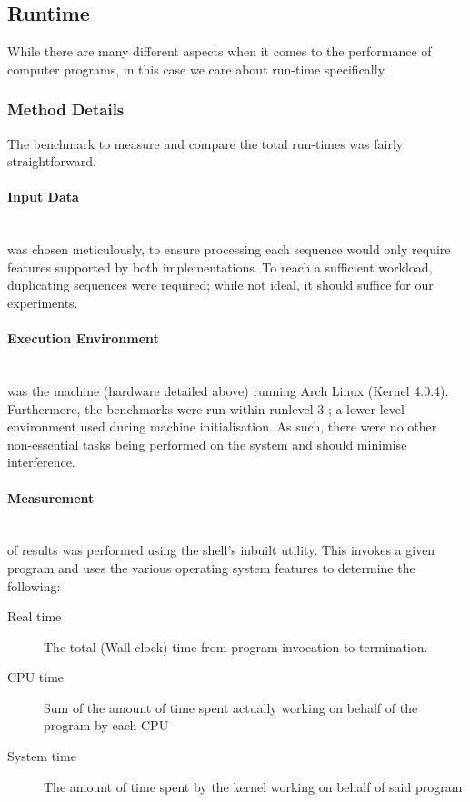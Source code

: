 \subsection{Runtime}
While there are many different aspects when it comes to the performance of computer programs, in this case we care about run-time specifically. 

\subsubsection{Method Details}

The benchmark to measure and compare the total run-times was fairly straightforward.

\paragraph{Input Data} \hfill \\
was chosen meticulously, to ensure processing each sequence would only require features supported by both implementations. To reach a sufficient workload, duplicating sequences were required; while not ideal, it should suffice for our experiments.

\paragraph{Execution Environment} \hfill \\
was the machine (hardware detailed above) running Arch Linux (Kernel 4.0.4). Furthermore, the benchmarks were run within runlevel 3 \autocite{runlevels}; a lower level environment used during machine initialisation. As such, there were no other non-essential tasks being performed on the system and should minimise interference.

\paragraph{Measurement} \hfill \\
of results was performed using the shell's inbuilt  utility. This invokes a given program and uses the various operating system features to determine the following:
\begin{description}
	\item[Real time] The total (Wall-clock) time from program invocation to termination.
	\item[CPU time] Sum of the amount of time spent actually working on behalf of the program by each CPU
	\item[System time] The amount of time spent by the kernel working on behalf of said program
\end{description}

